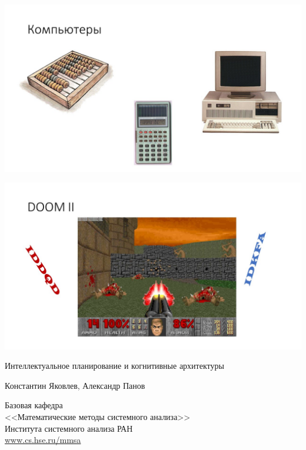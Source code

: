 \documentclass[default]{beamer}
\begin{document}
	\begin{frame}
		\includegraphics[width=\textwidth]{advert/slide4.jpg}
	\end{frame}

	\begin{frame}
		\includegraphics[width=\textwidth]{advert/slide5.jpg}
	\end{frame}
		
	\begin{frame}
		\centering
		\huge{Интеллектуальное планирование и когнитивные архитектуры}
		\par\bigskip
		\large{Константин Яковлев, Александр Панов}
		\par\bigskip
		\Large{Базовая кафедра\\
			<<Математические методы системного анализа>>\\
			Института системного анализа РАН\\
			\url{www.cs.hse.ru/mmsa}
		}
	\end{frame}
			
\end{document}
